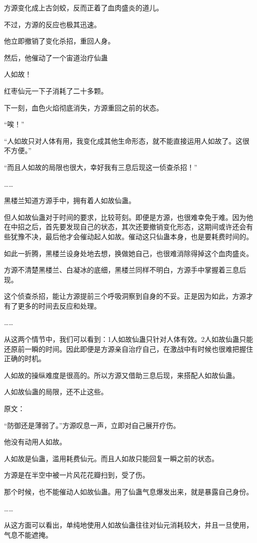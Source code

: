 \begin{this_body}
方源变化成上古剑蛟，反而正着了血肉盛炎的道儿。

不过，方源的反应也极其迅速。

他立即撤销了变化杀招，重回人身。

然后，他催动了一个宙道治疗仙蛊

人如故！

红枣仙元一下子消耗了二十多颗。

下一刻，血色火焰彻底消失，方源重回之前的状态。

“唉！”

“人如故只对人体有用，我变化成其他生命形态，就不能直接运用人如故了。这很不方便。”

“而且人如故的局限也很大，幸好我有三息后现这一侦查杀招！”

……

黑楼兰知道方源手中，拥有着人如故仙蛊。

但人如故仙蛊对于时间的要求，比较苛刻。即便是方源，也很难幸免于难。因为他在中招之后，首先要发现自己的状态，其次还要撤销变化形态，这期间或许还会有些犹豫不决，最后他才会催动起人如故。催动这只仙蛊本身，也是要耗费时间的。

如此一折腾，黑楼兰设身处地去想，换做她自己，也很难消除得掉这个血肉盛炎。

方源不清楚黑楼兰、白凝冰的底细，黑楼兰同样不明白，方源手中掌握着三息后现。

这个侦查杀招，能让方源提前三个呼吸洞察到自身的不妥。正是因为如此，方源才有了更多的时间去反应和处理。

……

从这两个情节中，我们可以看到：1人如故仙蛊只针对人体有效。2人如故仙蛊只能还原前一瞬的时间。因此即便是方源亲自治疗自己，在激战中有时候也很难把握住正确的时机。

人如故的操纵难度是很高的。所以方源又借助三息后现，来搭配人如故仙蛊。

人如故仙蛊的局限，还不止这些。

原文：

“防御还是薄弱了。”方源叹息一声，立即对自己展开疗伤。

他没有动用人如故。

人如故是仙蛊，滥用耗费仙元。而且人如故只能回复一瞬之前的状态。

方源是在半空中被一片风花花瓣扫到，受了伤。

那个时候，也不能催动人如故仙蛊。用了仙蛊气息爆发出来，就是暴露自己身份。

……

从这方面可以看出，单纯地使用人如故仙蛊往往对仙元消耗较大，并且一旦使用，气息不能遮掩。


\end{this_body}
